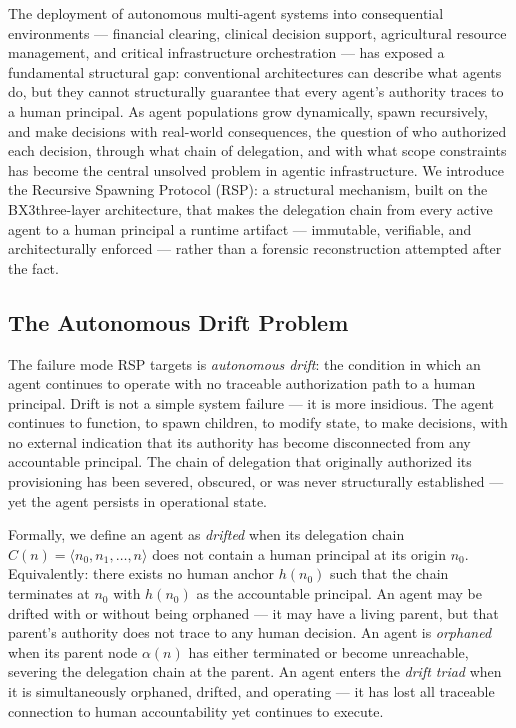 \documentclass[12pt]{article}
\def\bxthree{BX3}
\begin{document}
The deployment of autonomous multi-agent systems into consequential environments --- financial clearing, clinical decision support, agricultural resource management, and critical infrastructure orchestration --- has exposed a fundamental structural gap: conventional architectures can describe what agents do, but they cannot structurally guarantee that every agent's authority traces to a human principal. As agent populations grow dynamically, spawn recursively, and make decisions with real-world consequences, the question of who authorized each decision, through what chain of delegation, and with what scope constraints has become the central unsolved problem in agentic infrastructure. We introduce the Recursive Spawning Protocol (RSP): a structural mechanism, built on the \bxthree three-layer architecture, that makes the delegation chain from every active agent to a human principal a runtime artifact --- immutable, verifiable, and architecturally enforced --- rather than a forensic reconstruction attempted after the fact.

\subsection{The Autonomous Drift Problem}

The failure mode RSP targets is \emph{autonomous drift}: the condition in which an agent continues to operate with no traceable authorization path to a human principal. Drift is not a simple system failure --- it is more insidious. The agent continues to function, to spawn children, to modify state, to make decisions, with no external indication that its authority has become disconnected from any accountable principal. The chain of delegation that originally authorized its provisioning has been severed, obscured, or was never structurally established --- yet the agent persists in operational state.

Formally, we define an agent as \emph{drifted} when its delegation chain $C(n) = \langle n_0, n_1, \ldots, n \rangle$ does not contain a human principal at its origin $n_0$. Equivalently: there exists no human anchor $h(n_0)$ such that the chain terminates at $n_0$ with $h(n_0)$ as the accountable principal. An agent may be drifted with or without being orphaned --- it may have a living parent, but that parent's authority does not trace to any human decision. An agent is \emph{orphaned} when its parent node $\alpha(n)$ has either terminated or become unreachable, severing the delegation chain at the parent. An agent enters the \emph{drift triad} when it is simultaneously orphaned, drifted, and operating --- it has lost all traceable connection to human accountability yet continues to execute.
\end{document}
